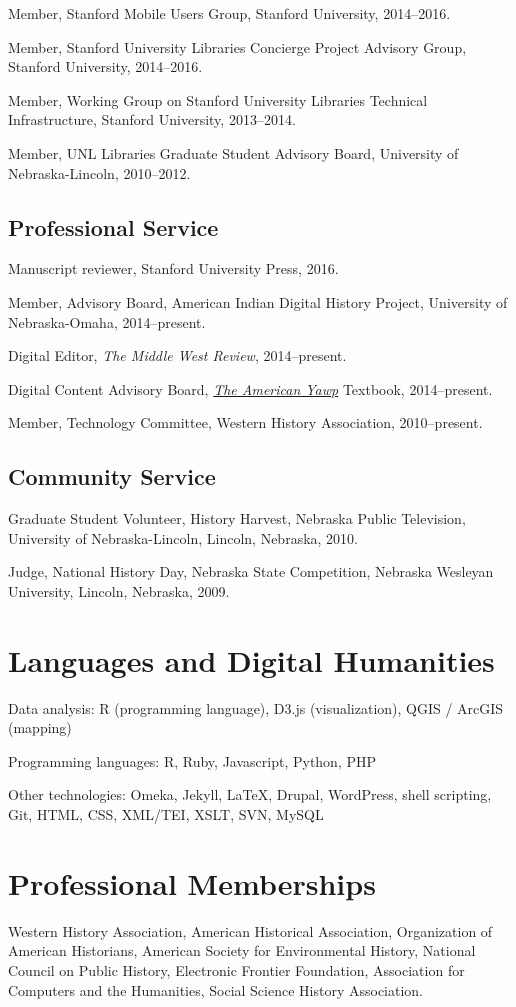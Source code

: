 Member, Stanford Mobile Users Group, Stanford University, 2014--2016.

Member, Stanford University Libraries Concierge Project Advisory Group,
Stanford University, 2014--2016.

Member, Working Group on Stanford University Libraries Technical
Infrastructure, Stanford University, 2013--2014.

Member, UNL Libraries Graduate Student Advisory Board, University of
Nebraska-Lincoln, 2010--2012.

\subsection{Professional Service}\label{professional-service}

Manuscript reviewer, Stanford University Press, 2016.

Member, Advisory Board, American Indian Digital History Project,
University of Nebraska-Omaha, 2014--present.

Digital Editor, \emph{The Middle West Review}, 2014--present.

Digital Content Advisory Board, \emph{\href{http://americanyawp.com}{The
American Yawp}} Textbook, 2014--present.

Member, Technology Committee, Western History Association,
2010--present.

\subsection{Community Service}\label{community-service}

Graduate Student Volunteer, History Harvest, Nebraska Public Television,
University of Nebraska-Lincoln, Lincoln, Nebraska, 2010.

Judge, National History Day, Nebraska State Competition, Nebraska
Wesleyan University, Lincoln, Nebraska, 2009.

\section{Languages and Digital
Humanities}\label{languages-and-digital-humanities}

Data analysis: R (programming language), D3.js (visualization), QGIS /
ArcGIS (mapping)

Programming languages: R, Ruby, Javascript, Python, PHP

Other technologies: Omeka, Jekyll, \LaTeX, Drupal, WordPress, shell
scripting, Git, HTML, CSS, XML/TEI, XSLT, SVN, MySQL

\section{Professional Memberships}\label{professional-memberships}

Western History Association, American Historical Association,
Organization of American Historians, American Society for Environmental
History, National Council on Public History, Electronic Frontier
Foundation, Association for Computers and the Humanities, Social Science
History Association.
